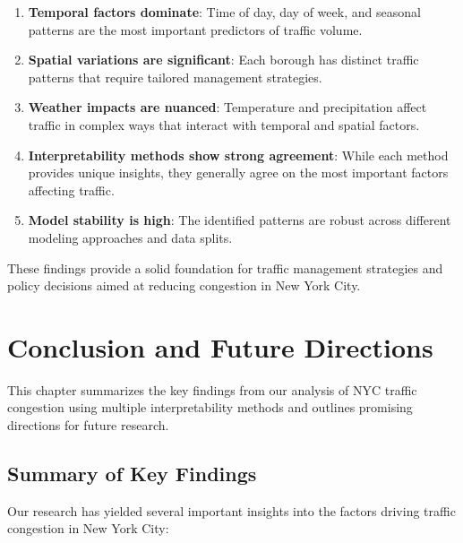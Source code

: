 \documentclass[
  letterpaper,
  DIV=11,
  numbers=noendperiod]{scrreprt}
\begin{document}
\begin{enumerate}
\def\labelenumi{\arabic{enumi}.}
\item
  \textbf{Temporal factors dominate}: Time of day, day of week, and
  seasonal patterns are the most important predictors of traffic volume.
\item
  \textbf{Spatial variations are significant}: Each borough has distinct
  traffic patterns that require tailored management strategies.
\item
  \textbf{Weather impacts are nuanced}: Temperature and precipitation
  affect traffic in complex ways that interact with temporal and spatial
  factors.
\item
  \textbf{Interpretability methods show strong agreement}: While each
  method provides unique insights, they generally agree on the most
  important factors affecting traffic.
\item
  \textbf{Model stability is high}: The identified patterns are robust
  across different modeling approaches and data splits.
\end{enumerate}

These findings provide a solid foundation for traffic management
strategies and policy decisions aimed at reducing congestion in New York
City.


\chapter{Conclusion and Future
Directions}\label{conclusion-and-future-directions}

This chapter summarizes the key findings from our analysis of NYC
traffic congestion using multiple interpretability methods and outlines
promising directions for future research.

\section{Summary of Key Findings}\label{summary-of-key-findings-1}

Our research has yielded several important insights into the factors
driving traffic congestion in New York City:
\end{document}
